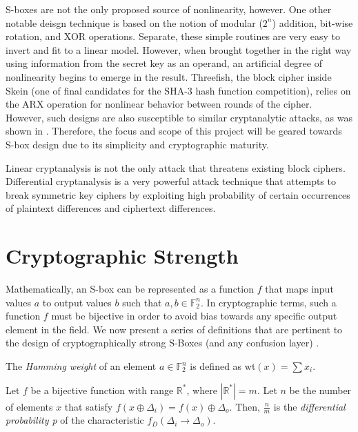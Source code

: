 \documentclass[11pt]{article}
\newcommand{\field}[1]{\mathbb{#1}} %
\begin{document}
S-boxes are not the only proposed source of nonlinearity, however. One other notable deisgn technique is based on the notion of modular ($2^n$) addition, bit-wise rotation, and XOR operations. Separate, these simple routines are very easy to invert and fit to a linear model. However, when brought together in the right way using information from the secret key as an operand, an artificial degree of nonlinearity begins to emerge in the result. Threefish, the block cipher inside Skein (one of final candidates for the SHA-3 hash function competition), relies on the ARX operation for nonlinear behavior between rounds of the cipher. However, such designs are also susceptible to similar cryptanalytic attacks, as was shown in \cite{Khovratovich:2010:RCA:1876089.1876116}. Therefore, the focus and scope of this project will be geared towards S-box design due to its simplicity and cryptographic maturity.

Linear cryptanalysis is not the only attack that threatens existing block ciphers. Differential cryptanalysis is a very powerful attack technique that attempts to break symmetric key ciphers by exploiting high probability of certain occurrences of plaintext differences and ciphertext differences\cite{Heys01atutorial}. 

\section{Cryptographic Strength}
Mathematically, an S-box can be represented as a function $f$ that maps input values $a$ to output values $b$ such that $a,b \in \field{F}_2^n$. In cryptographic terms, such a function $f$ must be bijective in order to avoid bias towards any specific output element in the field. We now present a series of definitions that are pertinent to the design of cryptographically strong S-Boxes (and any confusion layer) \cite{Mar_newanalysis}.


\begin{define}
The \emph{Hamming weight} of an element $a \in \field{F}_2^n$ is defined as wt$(x) = \sum x_i$.
\end{define}

\begin{define}
Let $f$ be a bijective function with range $\mathbb{R^*}$, where $|\mathbb{R^*}| = m$. Let $n$ be the number of elements $x$ that satisfy $f(x \oplus \Delta_i) = f(x) \oplus \Delta_o$. Then, $\frac{n}{m}$ is the \emph{differential probability p} of the characteristic $f_D(\Delta_i \to \Delta_o)$.
\end{define}
\end{document}
